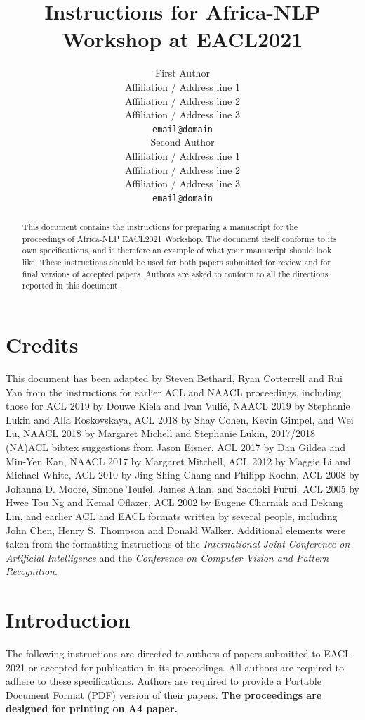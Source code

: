 \documentclass[11pt,a4paper]{article}
\title{Instructions for Africa-NLP Workshop at EACL2021}
\author{First Author \\
  Affiliation / Address line 1 \\
  Affiliation / Address line 2 \\
  Affiliation / Address line 3 \\
  \texttt{email@domain} \\\And
  Second Author \\
  Affiliation / Address line 1 \\
  Affiliation / Address line 2 \\
  Affiliation / Address line 3 \\
  \texttt{email@domain} \\}
\date{}
\begin{document}
\maketitle
\begin{abstract}
This document contains the instructions for preparing a manuscript for the proceedings of Africa-NLP EACL2021 Workshop.
The document itself conforms to its own specifications, and is therefore an example of what your manuscript should look like.
These instructions should be used for both papers submitted for review and for final versions of accepted papers.
Authors are asked to conform to all the directions reported in this document.
\end{abstract}

\section{Credits}

This document has been adapted
by Steven Bethard, Ryan Cotterrell and Rui Yan
from the instructions for earlier ACL and NAACL proceedings, including those for 
ACL 2019 by Douwe Kiela and Ivan Vuli\'{c},
NAACL 2019 by Stephanie Lukin and Alla Roskovskaya, 
ACL 2018 by Shay Cohen, Kevin Gimpel, and Wei Lu, 
NAACL 2018 by Margaret Michell and Stephanie Lukin,
2017/2018 (NA)ACL bibtex suggestions from Jason Eisner,
ACL 2017 by Dan Gildea and Min-Yen Kan, 
NAACL 2017 by Margaret Mitchell, 
ACL 2012 by Maggie Li and Michael White, 
ACL 2010 by Jing-Shing Chang and Philipp Koehn, 
ACL 2008 by Johanna D. Moore, Simone Teufel, James Allan, and Sadaoki Furui, 
ACL 2005 by Hwee Tou Ng and Kemal Oflazer, 
ACL 2002 by Eugene Charniak and Dekang Lin, 
and earlier ACL and EACL formats written by several people, including
John Chen, Henry S. Thompson and Donald Walker.
Additional elements were taken from the formatting instructions of the \emph{International Joint Conference on Artificial Intelligence} and the \emph{Conference on Computer Vision and Pattern Recognition}.

\section{Introduction}

The following instructions are directed to authors of papers submitted to EACL 2021 or accepted for publication in its proceedings.
All authors are required to adhere to these specifications.
Authors are required to provide a Portable Document Format (PDF) version of their papers.
\textbf{The proceedings are designed for printing on A4 paper.}
\end{document}
